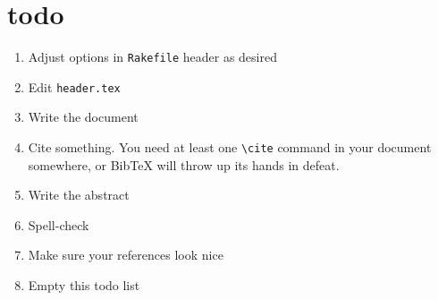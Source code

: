 \section*{todo}
\begin{enumerate}
\item Adjust options in \verb+Rakefile+ header as desired
\item Edit \verb+header.tex+
\item Write the document
\item Cite something. \cite[p.~999]{source} You need at least one \verb+\cite+ command in your document somewhere, or BibTeX will throw up its hands in defeat.
\item Write the abstract
\item Spell-check
\item Make sure your references look nice
\item Empty this todo list
\end{enumerate}
